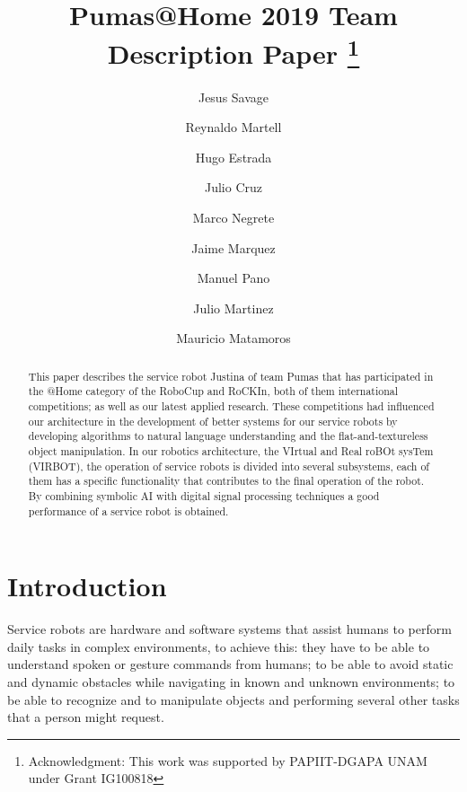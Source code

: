 \documentclass{llncs}
\begin{document}
\title{Pumas@Home 2019 Team Description Paper
\thanks{Acknowledgment: This work was supported by PAPIIT-DGAPA UNAM under Grant IG100818}}
\author{
	Jesus Savage 
	\and Reynaldo Martell 
	\and Hugo Estrada 
	\and Julio Cruz 
	\and Marco Negrete 
	\and Jaime Marquez
	\and Manuel Pano
	\and Julio Martinez
	\and Mauricio Matamoros
}
\maketitle


\begin{abstract}

This paper describes the service robot Justina of team Pumas that has participated in the @Home category of the RoboCup and RoCKIn, both of them international competitions; as well as our latest applied research. These competitions had influenced our architecture in the development of better systems for our service robots by developing algorithms to natural language understanding and the flat-and-textureless object manipulation.
In our robotics architecture, the VIrtual and Real roBOt sysTem (VIRBOT), the operation of service robots is divided into several subsystems, each of them has a specific functionality  that contributes to the final operation of the robot.
By combining symbolic AI with digital signal processing techniques a good performance of a service robot is obtained.

\end{abstract}


\section{Introduction}

Service robots are hardware and software systems that assist humans to perform daily tasks in complex environments, to achieve this: they have to be able to understand spoken or gesture commands from humans; to be able to avoid static and dynamic obstacles while navigating in known and unknown environments; to be able to recognize and to manipulate objects and performing several other tasks that a person might request. 
\end{document}
